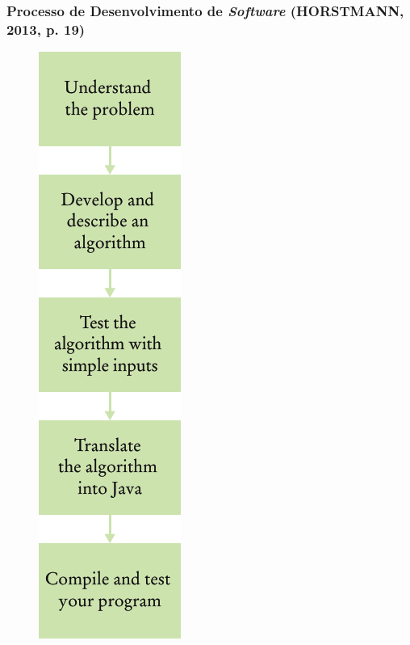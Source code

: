 \documentclass[aspectratio=169]{beamer}
\begin{document}
\begin{frame}\frametitle{Processo de Desenvolvimento de \emph{Software} {\tiny (HORSTMANN, 2013, p. 19)}}
\begin{figure}[h]
	\centering
	\includegraphics[height=0.7\paperheight]{pucrs-ep-fprog-unidade_01-introducao-laminas-desenvolvimento.png}
\end{figure}
\end{frame}
\end{document}
